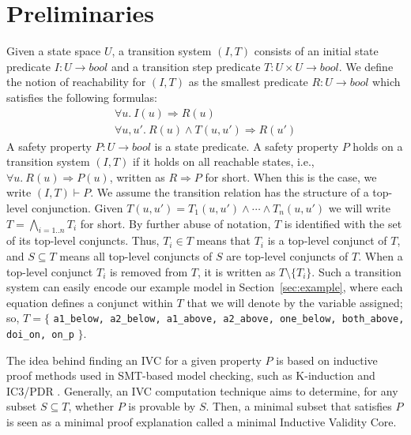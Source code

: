 \section{Preliminaries}
\label{sec:background}

\newcommand{\ivc}{\textit{IVC}}
\newcommand{\mivc}{\textit{MIVC}}
\newcommand{\bool}[0]{\mathit{bool}}
\newcommand{\reach}[0]{\mathit{R}}
\newcommand{\ite}[3]{\mathit{if}\ {#1}\ \mathit{then}\ {#2}\ \mathit{else}\ {#3}}

Given a state space $U$, a transition system $(I,T)$ consists of an
initial state predicate $I : U \to \bool$ and a transition step
predicate $T : U \times U \to \bool$.
We define the notion of
reachability for $(I, T)$ as the smallest predicate $\reach : U \to
\bool$ which satisfies the following formulas:
\begin{gather*}
  \forall u.~ I(u) \Rightarrow \reach(u) \\
  \forall u, u'.~ \reach(u) \land T(u, u') \Rightarrow \reach(u')
\end{gather*}
A safety property $P : U \to \bool$ is a state predicate. A safety
property $P$ holds on a transition system $(I, T)$ if it holds on all
reachable states, i.e., $\forall u.~ \reach(u) \Rightarrow P(u)$,
written as $\reach \Rightarrow P$ for short. When this is the case, we
write $(I, T)\vdash P$. We assume the transition relation has the structure of a top-level conjunction.  Given $T(u, u') = T_1(u, u') \land \cdots \land T_n(u, u')$ we will write $T = \bigwedge_{i=1..n}T_i$ for short.
By further abuse of notation,
$T$ is identified with the set of its top-level conjuncts. Thus, $T_i \in
T$ means that $T_i$ is a top-level conjunct of $T$, and $S
\subseteq T$ means all top-level conjuncts of $S$ are top-level
conjuncts of $T$. When a top-level conjunct $T_i$ is removed from $T$, it is written as $T \setminus \{T_i\}$. Such a transition system can easily encode our example model in Section~\ref{sec:example}, where each equation defines a conjunct within $T$ that we will denote by the variable assigned; so, $T = \{$ {\small \texttt{a1\_below, a2\_below, a1\_above, a2\_above, one\_below, both\_above, doi\_on, on\_p}} $\}$.

The idea behind finding an IVC for a given property $P$ \cite{Ghass16} is based on inductive proof methods used in SMT-based model checking, such as K-induction and IC3/PDR \cite{NFM2012:KaGaTiWh, amla2005analysis, Een2011:PDR}. Generally, an IVC computation technique aims to determine, for any subset $S \subseteq T$, whether $P$ is provable by $S$. Then, a minimal subset that satisfies $P$ is seen as a minimal proof explanation called a minimal Inductive Validity Core.


